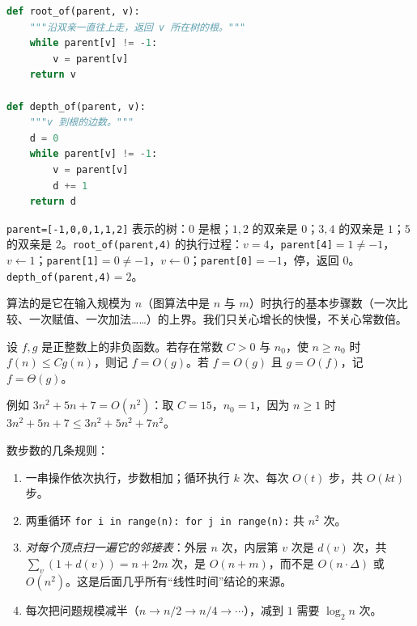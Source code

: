 \begin{lstlisting}[language=Python]
def root_of(parent, v):
    """沿双亲一直往上走，返回 v 所在树的根。"""
    while parent[v] != -1:
        v = parent[v]
    return v

def depth_of(parent, v):
    """v 到根的边数。"""
    d = 0
    while parent[v] != -1:
        v = parent[v]
        d += 1
    return d
\end{lstlisting}

\begin{example}
\texttt{parent=[-1,0,0,1,1,2]} 表示的树：$0$ 是根；$1,2$ 的双亲是 $0$；$3,4$ 的双亲是 $1$；$5$ 的双亲是 $2$。\texttt{root\_of(parent,4)} 的执行过程：$v=4$，\texttt{parent[4]}$=1\neq-1$，$v\gets1$；\texttt{parent[1]}$=0\neq-1$，$v\gets0$；\texttt{parent[0]}$=-1$，停，返回 $0$。\texttt{depth\_of(parent,4)}$=2$。
\begin{center}
\end{center}
\end{example}


算法的是它在输入规模为 $n$（图算法中是 $n$ 与 $m$）时执行的基本步骤数（一次比较、一次赋值、一次加法……）的上界。我们只关心增长的快慢，不关心常数倍。

\begin{definition}\label{def:data-structures:big-o}
设 $f,g$ 是正整数上的非负函数。若存在常数 $C>0$ 与 $n_0$，使 $n\geqslant n_0$ 时 $f(n)\leqslant Cg(n)$，则记 $f=O(g)$。若 $f=O(g)$ 且 $g=O(f)$，记 $f=\Theta(g)$。
\end{definition}

例如 $3n^2+5n+7=O(n^2)$：取 $C=15$，$n_0=1$，因为 $n\geqslant1$ 时 $3n^2+5n+7\leqslant3n^2+5n^2+7n^2$。

数步数的几条规则：
\begin{enumerate}
\item 一串操作依次执行，步数相加；循环执行 $k$ 次、每次 $O(t)$ 步，共 $O(kt)$ 步。
\item 两重循环 \texttt{for i in range(n): for j in range(n):} 共 $n^2$ 次。
\item \emph{对每个顶点扫一遍它的邻接表}：外层 $n$ 次，内层第 $v$ 次是 $d(v)$ 次，共 $\sum_v(1+d(v))=n+2m$ 次，是 $O(n+m)$，而不是 $O(n\cdot\Delta)$ 或 $O(n^2)$。这是后面几乎所有“线性时间”结论的来源。
\item 每次把问题规模减半（$n\to n/2\to n/4\to\cdots$），减到 $1$ 需要 $\log_2n$ 次。
\end{enumerate}

